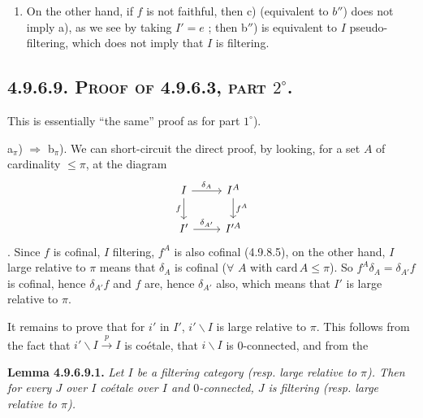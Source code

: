 \documentclass[11pt]{article}
\newcommand{\msp}[1]{\marginpar{\footnotesize [#1]}}
\newcommand{\bs}{\backslash}
\begin{document}
\begin{enumerate}[label=\arabic*$^\circ$)]
\item On the other hand, if $f$ is not faithful, then c) (equivalent to $b''$) does not imply a), as we see by taking $I' = e$ ; then b$''$) is equivalent to $I$ pseudo-filtering, which does not imply that $I$ is filtering.
\end{enumerate}

\subsection*{\msp{page 237}\textbf{4.9.6.9.} \textsc{Proof of 4.9.6.3, part} $2^\circ$.}

This is essentially ``the same'' proof as for part $1^\circ$).

a$_\pi$) $\Longrightarrow$ b$_\pi$). We can short-circuit the direct proof, by looking, for a set $A$ of cardinality $\leqslant \pi$, at the diagram
\[
\begin{tikzcd}
I \arrow[r, "\delta_A"] \arrow[d, "f"'] & I^A \arrow[d, "f^A"] \\
I' \arrow[r, "\delta_{A'}"] & I'^A
\end{tikzcd}
\]
. Since $f$ is cofinal, $I$ filtering, $f^A$ is also cofinal (4.9.8.5), on the other hand, $I$ large relative to $\pi$ means that $\delta_A$ is cofinal ($\forall$ $A$ with $\mathrm{card}\, A \leqslant \pi$). So $f^A\delta_A = \delta_{A'}f$ is cofinal, hence $\delta_{A'}f$ and $f$ are, hence $\delta_{A'}$ also, which means that $I'$ is large relative to $\pi$.

It remains to prove that for $i'$ in $I'$, $i'\bs I$ is large relative to $\pi$. This follows from the fact that $i'\bs I \xrightarrow{p} I$ is coétale, that $i\bs I$ is 0-connected, and from the

\textbf{Lemma 4.9.6.9.1.} \textit{Let $I$ be a filtering category (resp. large relative to $\pi$). Then for every $J$ over $I$ coétale over $I$ and $0$-connected, $J$ is filtering (resp. large relative to $\pi$).}
\end{document}
